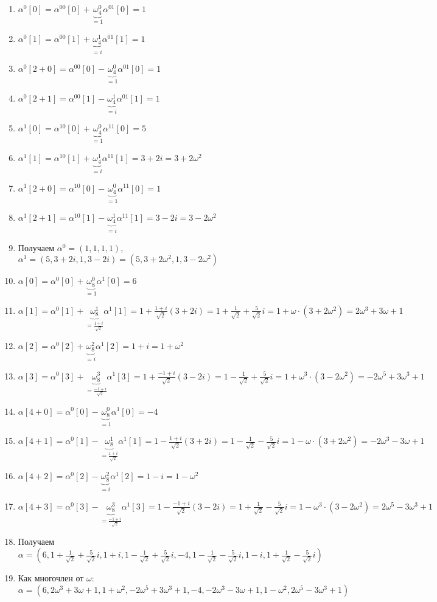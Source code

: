\documentclass[a4paper]{article}
\begin{document}
\begin{enumerate}
\begin{enumerate}
\item $\alpha^0[0]=\alpha^{00}[0]+\underbrace{\omega_4^0}_{=1}\alpha^{01}[0]=1$
\item $\alpha^0[1]=\alpha^{00}[1]+\underbrace{\omega_4^1}_{=i}\alpha^{01}[1]=1$
\item $\alpha^0[2+0]=\alpha^{00}[0]-\underbrace{\omega_4^0}_{=1}\alpha^{01}[0]=1$
\item $\alpha^0[2+1]=\alpha^{00}[1]-\underbrace{\omega_4^1}_{=i}\alpha^{01}[1]=1$
\newpage
\item $\alpha^1[0]=\alpha^{10}[0]+\underbrace{\omega_4^0}_{=1}\alpha^{11}[0]=5$
\item $\alpha^1[1]=\alpha^{10}[1]+\underbrace{\omega_4^1}_{=i}\alpha^{11}[1]=3+2i=3+2\omega^2$
\item $\alpha^1[2+0]=\alpha^{10}[0]-\underbrace{\omega_4^0}_{=1}\alpha^{11}[0]=1$
\item $\alpha^1[2+1]=\alpha^{10}[1]-\underbrace{\omega_4^1}_{=i}\alpha^{11}[1]=3-2i=3-2\omega^2$
\item Получаем $\alpha^0=(1,1,1,1)$, $\alpha^1=(5,3+2i,1,3-2i)=(5,3+2\omega^2,1,3-2\omega^2)$
\item $\alpha[0]=\alpha^0[0]+\underbrace{\omega_8^0}_{=1}\alpha^1[0]=6$
\item $\alpha[1]=\alpha^0[1]+\underbrace{\omega_8^1}_{=\frac{1+i}{\sqrt{2}}}\alpha^1[1]=1+\frac{1+i}{\sqrt{2}}(3+2i)=1+\frac{1}{\sqrt{2}}+\frac{5}{\sqrt{2}}i=1+\omega\cdot(3+2\omega^2)=2\omega^3+3\omega+1$
\item $\alpha[2]=\alpha^0[2]+\underbrace{\omega_8^2}_{=i}\alpha^1[2]=1+i=1+\omega^2$
\item $\alpha[3]=\alpha^0[3]+\underbrace{\omega_8^3}_{=\frac{-1+i}{\sqrt{2}}}\alpha^1[3]=1+\frac{-1+i}{\sqrt{2}}(3-2i)=1-\frac{1}{\sqrt{2}}+\frac{5}{\sqrt{2}}i=1+\omega^3\cdot(3-2\omega^2)=-2\omega^5+3\omega^3+1$

\item $\alpha[4+0]=\alpha^0[0]-\underbrace{\omega_8^0}_{=1}\alpha^1[0]=-4$
\item $\alpha[4+1]=\alpha^0[1]-\underbrace{\omega_8^1}_{=\frac{1+i}{\sqrt{2}}}\alpha^1[1]=1-\frac{1+i}{\sqrt{2}}(3+2i)=1-\frac{1}{\sqrt{2}}-\frac{5}{\sqrt{2}}i=1-\omega\cdot(3+2\omega^2)=-2\omega^3-3\omega+1$
\item $\alpha[4+2]=\alpha^0[2]-\underbrace{\omega_8^2}_{=i}\alpha^1[2]=1-i=1-\omega^2$
\item $\alpha[4+3]=\alpha^0[3]-\underbrace{\omega_8^3}_{=\frac{-1+i}{\sqrt{2}}}\alpha^1[3]=1-\frac{-1+i}{\sqrt{2}}(3-2i)=1+\frac{1}{\sqrt{2}}-\frac{5}{\sqrt{2}}i=1-\omega^3\cdot(3-2\omega^2)=2\omega^5-3\omega^3+1$
\item Получаем $\alpha=(6,1+\frac{1}{\sqrt{2}}+\frac{5}{\sqrt{2}}i,1+i,1-\frac{1}{\sqrt{2}}+\frac{5}{\sqrt{2}}i,-4,1-\frac{1}{\sqrt{2}}-\frac{5}{\sqrt{2}}i,1-i,1+\frac{1}{\sqrt{2}}-\frac{5}{\sqrt{2}}i)$
\item Как многочлен от $\omega$: $\alpha=(6,2\omega^3+3\omega+1,1+\omega^2,-2\omega^5+3\omega^3+1,-4,-2\omega^3-3\omega+1,1-\omega^2,2\omega^5-3\omega^3+1)$
\end{enumerate}



\end{enumerate}
\end{document}
